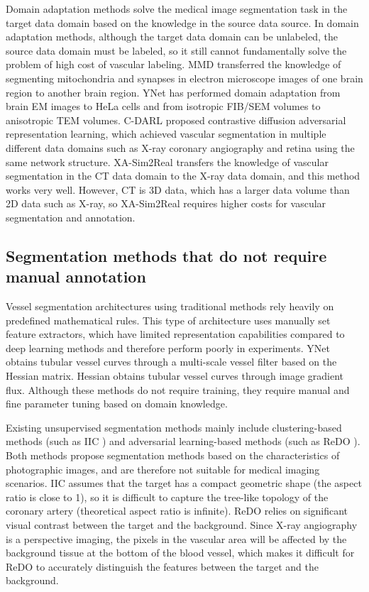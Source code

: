 Domain adaptation methods solve the medical image segmentation task in the target data domain based on the knowledge in the source data source. In domain adaptation methods, although the target data domain can be unlabeled, the source data domain must be labeled, so it still cannot fundamentally solve the problem of high cost of vascular labeling. MMD \cite{SSVS.3} transferred the knowledge of segmenting mitochondria and synapses in electron microscope images of one brain region to another brain region. YNet\cite{SSVS.31} has performed domain adaptation from brain EM images to HeLa cells and from isotropic FIB/SEM volumes to anisotropic TEM volumes. C-DARL\cite{01.00.C-DARL} proposed contrastive diffusion adversarial representation learning, which achieved vascular segmentation in multiple different data domains such as X-ray coronary angiography and retina using the same network structure. XA-Sim2Real\cite{00.01.XA-Sim2Real} transfers the knowledge of vascular segmentation in the CT data domain to the X-ray data domain, and this method works very well. However, CT is 3D data, which has a larger data volume than 2D data such as X-ray, so XA-Sim2Real requires higher costs for vascular segmentation and annotation.

\subsection{Segmentation methods that do not require manual annotation}

Vessel segmentation architectures using traditional methods rely heavily on predefined mathematical rules. This type of architecture uses manually set feature extractors, which have limited representation capabilities compared to deep learning methods and therefore perform poorly in experiments. YNet\cite{FC.13.YNet} obtains tubular vessel curves through a multi-scale vessel filter based on the Hessian matrix. Hessian\cite{FC.22.Hessian} obtains tubular vessel curves through image gradient flux. Although these methods do not require training, they require manual and fine parameter tuning based on domain knowledge.

Existing unsupervised segmentation methods mainly include clustering-based methods (such as IIC \cite{FC.19.IIC}) and adversarial learning-based methods (such as ReDO \cite{FC.9.ReDO}). Both methods propose segmentation methods based on the characteristics of photographic images, and are therefore not suitable for medical imaging scenarios. IIC assumes that the target has a compact geometric shape (the aspect ratio is close to 1), so it is difficult to capture the tree-like topology of the coronary artery (theoretical aspect ratio is infinite). ReDO relies on significant visual contrast between the target and the background. Since X-ray angiography is a perspective imaging, the pixels in the vascular area will be affected by the background tissue at the bottom of the blood vessel, which makes it difficult for ReDO to accurately distinguish the features between the target and the background.

